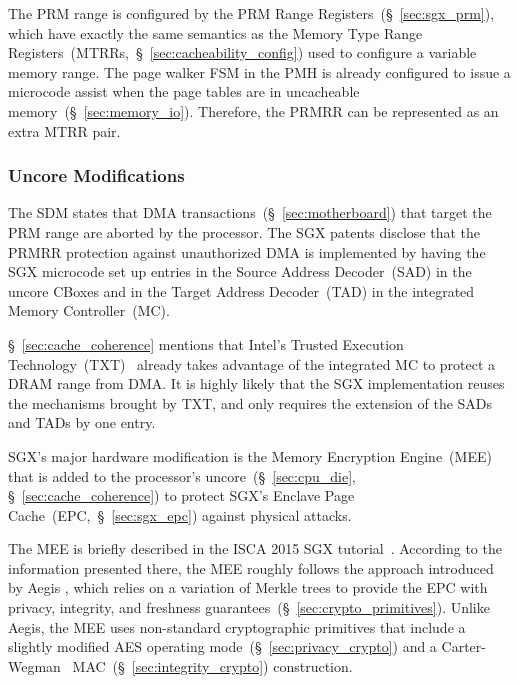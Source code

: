 The PRM range is configured by the PRM Range Registers~(\S~\ref{sec:sgx_prm}),
which have exactly the same semantics as the Memory Type Range
Registers~(MTRRs,~\S~\ref{sec:cacheability_config}) used to configure a
variable memory range. The page walker FSM in the PMH is already configured to
issue a microcode assist when the page tables are in uncacheable
memory~(\S~\ref{sec:memory_io}). Therefore, the PRMRR can be represented as an
extra MTRR pair.


\subsubsection{Uncore Modifications}
\label{sec:sgx_uncore_modifications}


The SDM states that DMA transactions~(\S~\ref{sec:motherboard}) that target the
PRM range are aborted by the processor. The SGX patents disclose that the PRMRR
protection against unauthorized DMA is implemented by having the SGX microcode
set up entries in the Source Address Decoder~(SAD) in the uncore CBoxes and in
the Target Address Decoder~(TAD) in the integrated Memory Controller~(MC).

\S~\ref{sec:cache_coherence} mentions that Intel's Trusted Execution
Technology~(TXT)~\cite{grawrock2009txt} already takes advantage of the
integrated MC to protect a DRAM range from DMA. It is highly likely that the
SGX implementation reuses the mechanisms brought by TXT, and only requires the
extension of the SADs and TADs by one entry.

SGX's major hardware modification is the Memory Encryption Engine~(MEE) that is
added to the processor's uncore~(\S~\ref{sec:cpu_die},
\S~\ref{sec:cache_coherence}) to protect SGX's Enclave Page
Cache~(EPC,~\S~\ref{sec:sgx_epc}) against physical attacks.


The MEE is briefly described in the ISCA 2015 SGX
tutorial~\cite{intel2015iscasgx}. According to the information presented there,
the MEE roughly follows the approach introduced by Aegis \cite{suh2003aegis}
\cite{aegis_impl}, which relies on a variation of Merkle trees to provide the
EPC with privacy, integrity, and freshness
guarantees~(\S~\ref{sec:crypto_primitives}). Unlike Aegis, the MEE uses
non-standard cryptographic primitives that include a slightly modified AES
operating mode~(\S~\ref{sec:privacy_crypto}) and a
Carter-Wegman~\cite{carter1977mac, wegman1981mac}
MAC~(\S~\ref{sec:integrity_crypto}) construction.

